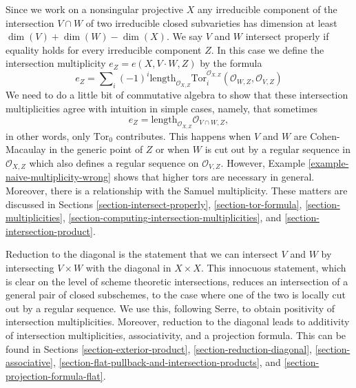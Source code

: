 \medskip\noindent
Since we work on a nonsingular projective $X$ any irreducible component
of the intersection $V \cap W$ of two irreducible closed subvarieties
has dimension at least $\dim(V) + \dim(W) - \dim(X)$. We say $V$ and $W$
intersect properly if equality holds for every irreducible component $Z$.
In this case we define the intersection multiplicity
$e_Z = e(X, V \cdot W, Z)$ by the formula
$$
e_Z = \sum\nolimits_i
(-1)^i
\text{length}_{\mathcal{O}_{X, Z}}
\text{Tor}_i^{\mathcal{O}_{X, Z}}(\mathcal{O}_{W, Z}, \mathcal{O}_{V, Z})
$$
We need to do a little bit of commutative algebra to show that these
intersection multiplicities agree with intuition in simple cases,
namely, that sometimes
$$
e_Z = \text{length}_{\mathcal{O}_{X, Z}} \mathcal{O}_{V \cap W, Z},
$$
in other words, only $\text{Tor}_0$ contributes. This happens when
$V$ and $W$ are Cohen-Macaulay in the generic point of $Z$ or when
$W$ is cut out by a regular sequence in $\mathcal{O}_{X, Z}$ which
also defines a regular sequence on $\mathcal{O}_{V, Z}$. However,
Example \ref{example-naive-multiplicity-wrong} shows that higher
tors are necessary in general. Moreover, there is a relationship
with the Samuel multiplicity. These matters are discussed in
Sections
\ref{section-intersect-properly},
\ref{section-tor-formula},
\ref{section-multiplicities},
\ref{section-computing-intersection-multiplicities}, and
\ref{section-intersection-product}. 

\medskip\noindent
Reduction to the diagonal is the statement that we can intersect
$V$ and $W$ by intersecting $V \times W$ with the diagonal in $X \times X$.
This innocuous statement, which is clear on the level of scheme
theoretic intersections, reduces an intersection of a general pair
of closed subschemes, to the case where one of the two is locally cut
out by a regular sequence. We use this, following Serre, to obtain positivity
of intersection multiplicities. Moreover, reduction to the diagonal
leads to additivity of intersection multiplicities, associativity, and a
projection formula. This can be found in Sections
\ref{section-exterior-product},
\ref{section-reduction-diagonal},
\ref{section-associative},
\ref{section-flat-pullback-and-intersection-products}, and
\ref{section-projection-formula-flat}.

